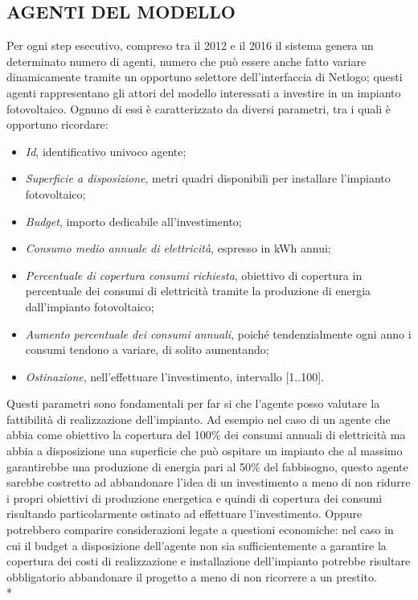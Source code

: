 \documentclass[12pt,a4paper,openright,twoside]{report}
\begin{document}
\subsection{AGENTI DEL MODELLO}
Per ogni step esecutivo, compreso tra il 2012 e il 2016 il sistema genera un determinato numero di agenti, numero che può essere anche fatto variare dinamicamente tramite un opportuno selettore dell'interfaccia di Netlogo; questi agenti rappresentano gli attori del modello interessati a investire in un impianto fotovoltaico. Ognuno di essi è caratterizzato da diversi parametri, tra i quali è opportuno ricordare:
\begin{itemize}
\item \emph{Id}, identificativo univoco agente;
\item \emph{Superficie a disposizione}, metri quadri disponibili per installare l'impianto fotovoltaico;
\item \emph{Budget}, importo dedicabile all'investimento;
\item \emph{Consumo medio annuale di elettricità}, espresso in kWh annui;
\item \emph{Percentuale di copertura consumi richiesta}, obiettivo di copertura in percentuale dei consumi di elettricità tramite la produzione di energia dall'impianto fotovoltaico;
\item \emph{Aumento percentuale dei consumi annuali}, poiché tendenzialmente ogni anno i consumi tendono a variare, di solito aumentando;
\item \emph{Ostinazione}, nell'effettuare l'investimento, intervallo [1..100].
\end{itemize}
Questi parametri sono fondamentali per far si che l'agente posso valutare la fattibilità di realizzazione dell'impianto. Ad esempio nel caso di un agente che abbia come obiettivo la copertura del 100\% dei consumi annuali di elettricità ma abbia a disposizione una superficie che può ospitare un impianto che al massimo garantirebbe una produzione di energia pari al 50\% del fabbisogno, questo agente sarebbe costretto ad abbandonare l'idea di un investimento a meno di non ridurre i propri obiettivi di produzione energetica e quindi di copertura dei consumi risultando particolarmente ostinato ad effettuare l'investimento. Oppure potrebbero comparire considerazioni legate a questioni economiche: nel caso in cui il budget a disposizione dell'agente non sia sufficientemente a garantire la copertura dei costi di realizzazione e installazione dell'impianto potrebbe risultare obbligatorio abbandonare il progetto a meno di non ricorrere a un prestito. \\*
\end{document}
